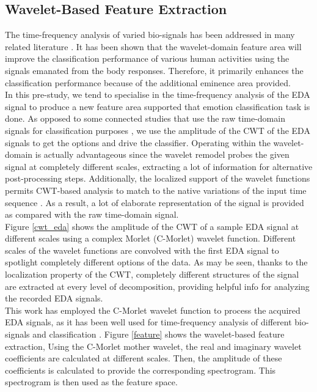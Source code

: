 \subsection{Wavelet-Based Feature Extraction}
The time-frequency analysis of varied bio-signals has been addressed in many 
related literature \cite{golshan2016multiple, golshan2017fft, golshan2018hierarchical, li2008prior}. 
It has been shown that the wavelet-domain feature area will improve the classification 
performance of various human activities using the signals emanated from the body 
responses. Therefore, it primarily enhances the classification performance because of 
the additional eminence area provided.\\
In this pre-study, we tend to specialise in the time-frequency analysis of the EDA signal to produce 
a new feature area supported that emotion classification task is done. As 
opposed to some connected studies that use the raw time-domain signals for 
classification purposes \cite{ArousalValence2017, EmotionClass2012}, we use the 
amplitude of the CWT of the EDA signals to get the options and drive the 
classifier. Operating within the wavelet-domain is actually advantageous since the 
wavelet remodel probes the given signal at completely different scales, extracting a lot of 
information for alternative post-processing steps. Additionally, the localized support 
of the wavelet functions permits CWT-based analysis to match to the native variations 
of the input time sequence \cite{WaveletFilter1992}. As a result, a lot of elaborate 
representation of the signal is provided as compared with the raw time-domain signal.\\
Figure \ref{cwt_eda} shows the amplitude of the CWT of a sample EDA signal at different scales 
using a complex Morlet (C-Morlet) wavelet function. Different scales of the wavelet functions are convolved with the first 
EDA signal to spotlight completely different options of the data. As may be seen, thanks to the localization 
property of the CWT, completely different structures of the signal are extracted at every level 
of decomposition, providing helpful info for analyzing the recorded EDA signals.\\
This work has employed the C-Morlet wavelet function to process the acquired EDA 
signals, as it has been well used for time-frequency analysis of different bio-signals 
and classification \cite{golshan2016multiple}. Figure \ref{feature} shows the wavelet-based 
feature extraction, Using the C-Morlet mother wavelet, the real and imaginary wavelet 
coefficients are calculated at different scales. Then, the amplitude of these coefficients 
is calculated to provide the corresponding spectrogram. This spectrogram is then used as 
the feature space.\\

